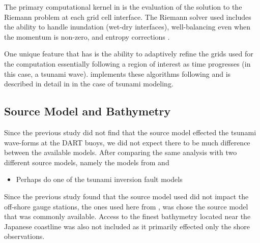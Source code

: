 The primary computational kernel in \geoclaw is the evaluation of the solution to the Riemann problem at each grid cell interface.  The Riemann solver used includes the ability to handle inundation (wet-dry interfaces), well-balancing even when the momentum is non-zero, and entropy corrections \cite{George:2008aa}.

One unique feature that \geoclaw has is the ability to adaptively refine the grids used for the computation essentially following a region of interest as time progresses (in this case, a tsunami wave).  \geoclaw implements these algorithms following \cite{Berger:1984ui,Berger:1998aa} and is described in detail in \cite{Berger:2011du} in the case of tsunami modeling.



\subsection{Source Model and Bathymetry}

Since the previous study \cite{MacInnes:2013cr} did not find that the source model effected the tsunami wave-forms at the DART buoys, we did not expect there to be much difference between the available models.  After comparing the same analysis with two different source models, namely the models from \cite{Ammon:2011dm} and

\begin{itemize}
    \item Perhaps do one of the tsunami inversion fault models
\end{itemize}

Since the previous study found that the source model used did not impact the off-shore gauge stations, the ones used here from \cite{Ammon:2011dm}, was chose the source model that was commonly available.  Access to the finest bathymetry located near the Japanese coastline was also not included as it primarily effected only the shore observations.

